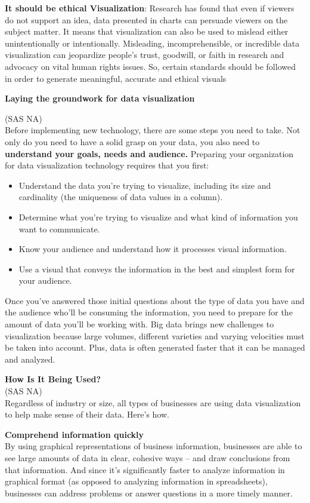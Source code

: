 \documentclass[]{book}
\providecommand{\tightlist}{%
  \setlength{\itemsep}{0pt}\setlength{\parskip}{0pt}}
\theoremstyle{definition}
\theoremstyle{definition}
\theoremstyle{definition}
\theoremstyle{remark}
\begin{document}
\textbf{It should be ethical Visualization}: Research has found that
even if viewers do not support an idea, data presented in charts can
persuade viewers on the subject matter. It means that visualization can
also be used to mislead either unintentionally or intentionally.
Misleading, incomprehensible, or incredible data visualization can
jeopardize people's trust, goodwill, or faith in research and advocacy
on vital human rights issues. So, certain standards should be followed
in order to generate meaningful, accurate and ethical visuals

\textbf{Laying the groundwork for data visualization}

(SAS NA)\\
Before implementing new technology, there are some steps you need to
take. Not only do you need to have a solid grasp on your data, you also
need to \textbf{understand your goals, needs and audience.} Preparing
your organization for data visualization technology requires that you
first:

\begin{itemize}
\tightlist
\item
  Understand the data you're trying to visualize, including its size and
  cardinality (the uniqueness of data values in a column).
\item
  Determine what you're trying to visualize and what kind of information
  you want to communicate.
\item
  Know your audience and understand how it processes visual information.
\item
  Use a visual that conveys the information in the best and simplest
  form for your audience.
\end{itemize}

Once you've answered those initial questions about the type of data you
have and the audience who'll be consuming the information, you need to
prepare for the amount of data you'll be working with. Big data brings
new challenges to visualization because large volumes, different
varieties and varying velocities must be taken into account. Plus, data
is often generated faster that it can be managed and analyzed.

\textbf{How Is It Being Used?}\\
(SAS NA)\\
Regardless of industry or size, all types of businesses are using data
visualization to help make sense of their data. Here's how.

\textbf{Comprehend information quickly}\\
By using graphical representations of business information, businesses
are able to see large amounts of data in clear, cohesive ways -- and
draw conclusions from that information. And since it's significantly
faster to analyze information in graphical format (as opposed to
analyzing information in spreadsheets), businesses can address problems
or answer questions in a more timely manner.
\end{document}
